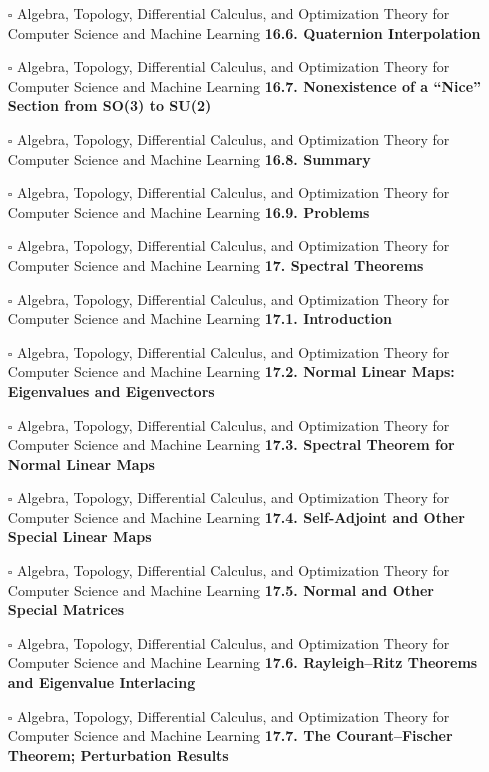 \documentclass[a4, landscape, 12pt]{article}
\newcommand{\checkbox}{$\square$}%
\begin{document}
\begin{itemize}
{}
\item [\checkbox]  Algebra, Topology, Differential Calculus, and Optimization Theory for Computer Science and Machine Learning \textbf{ 16.6. Quaternion Interpolation
}
\item [\checkbox]  Algebra, Topology, Differential Calculus, and Optimization Theory for Computer Science and Machine Learning \textbf{ 16.7. Nonexistence of a “Nice” Section from SO(3) to SU(2)
}
\item [\checkbox]  Algebra, Topology, Differential Calculus, and Optimization Theory for Computer Science and Machine Learning \textbf{ 16.8. Summary
}
\item [\checkbox]  Algebra, Topology, Differential Calculus, and Optimization Theory for Computer Science and Machine Learning \textbf{ 16.9. Problems
}
\item [\checkbox]  Algebra, Topology, Differential Calculus, and Optimization Theory for Computer Science and Machine Learning \textbf{ 17. Spectral Theorems
}
\item [\checkbox]  Algebra, Topology, Differential Calculus, and Optimization Theory for Computer Science and Machine Learning \textbf{ 17.1. Introduction
}
\item [\checkbox]  Algebra, Topology, Differential Calculus, and Optimization Theory for Computer Science and Machine Learning \textbf{ 17.2. Normal Linear Maps: Eigenvalues and Eigenvectors
}
\item [\checkbox]  Algebra, Topology, Differential Calculus, and Optimization Theory for Computer Science and Machine Learning \textbf{ 17.3. Spectral Theorem for Normal Linear Maps
}
\item [\checkbox]  Algebra, Topology, Differential Calculus, and Optimization Theory for Computer Science and Machine Learning \textbf{ 17.4. Self-Adjoint and Other Special Linear Maps
}
\item [\checkbox]  Algebra, Topology, Differential Calculus, and Optimization Theory for Computer Science and Machine Learning \textbf{ 17.5. Normal and Other Special Matrices
}
\item [\checkbox]  Algebra, Topology, Differential Calculus, and Optimization Theory for Computer Science and Machine Learning \textbf{ 17.6. Rayleigh–Ritz Theorems and Eigenvalue Interlacing
}
\item [\checkbox]  Algebra, Topology, Differential Calculus, and Optimization Theory for Computer Science and Machine Learning \textbf{ 17.7. The Courant–Fischer Theorem; Perturbation Results
}

\end{itemize}
\end{document}
